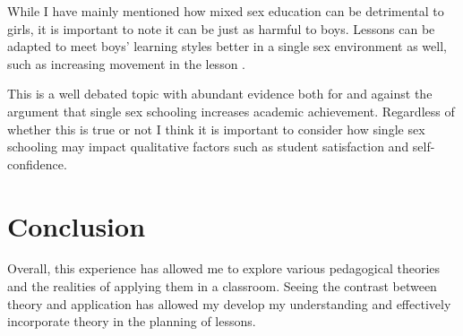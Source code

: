 \documentclass[11pt, a4paper, notitlepage]{article}
\begin{document}
\par
While I have mainly mentioned how mixed sex education can be detrimental to girls, it is important to note it can be just as harmful to boys. Lessons can be adapted to meet boys' learning styles better in a single sex environment as well, such as increasing movement in the lesson \cite{Hughes:2006}.
\par
This is a well debated topic with abundant evidence both for and against the argument that single sex schooling increases academic achievement. Regardless of whether this is true or not I think it is important to consider how single sex schooling may impact qualitative factors such as student satisfaction and self-confidence.


\section*{Conclusion}
Overall, this experience has allowed me to explore various pedagogical theories and the realities of applying them in a classroom. Seeing the contrast between theory and application has allowed my develop my understanding and effectively incorporate theory in the planning of lessons. 



\end{document}
